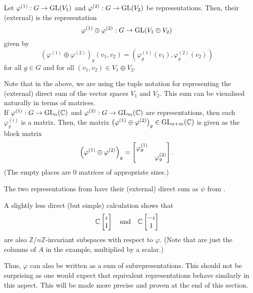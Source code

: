 \begin{defn}%
	Let $\varphi^{(1)}:G \to \operatorname{GL}(V_1)$ and $\varphi^{(2)}:G \to \operatorname{GL}(V_2)$ be representations. Then, their (external)  is the representation
	\begin{equation*} 
		\varphi^{(1)}\oplus\varphi^{(2)} : G \to \operatorname{GL}(V_1 \oplus V_2)
	\end{equation*}
	given by
	\begin{equation*} 
		\left(\varphi^{(1)}\oplus\varphi^{(2)}\right)_g(v_1, v_2) = \left(\varphi^{(1)}_g(v_1), \varphi^{(2)}_g(v_2)\right)
	\end{equation*}
	for all $g \in G$ and for all $(v_1, v_2) \in V_1 \oplus V_2.$
\end{defn}
Note that in the above, we are using the tuple notation for representing the (external) direct sum of the vector spaces $V_1$ and $V_2.$ This sum can be visualised naturally in terms of matrices.\\
If $\varphi^{(1)}:G\to \operatorname{GL}_n(\mathbb{C})$ and $\varphi^{(2)}:G \to \operatorname{GL}_m(\mathbb{C})$ are representations, then each $\varphi^{(i)}_g$ is a matrix. Then, the matrix $\left(\varphi^{(1)} \oplus \varphi^{(2)}\right)_g \in \operatorname{GL}_{n + m}(\mathbb{C})$ is given as the block matrix
\begin{equation*} 
	\left(\varphi^{(1)} \oplus \varphi^{(2)}\right)_g = \begin{bmatrix} \varphi_g^{(1)} &  \\  & \varphi_g^{(2)} \end{bmatrix}.
\end{equation*}
(The empty places are $0$ matrices of appropriate sizes.)

\begin{ex}
	The two representations from  have their (external) direct sum as $\psi$ from .

	A slightly less direct (but simple) calculation shows that 
	\begin{equation*} 
		\mathbb{C}\begin{bmatrix} \iota \\ 1 \end{bmatrix} \quad\text{and}\quad \mathbb{C}\begin{bmatrix} -\iota \\ 1 \end{bmatrix}
	\end{equation*}
	are also $\mathbb{Z}/n\mathbb{Z}$-invariant subspaces with respect to $\varphi.$ (Note that are just the columns of $A$ in the example, multiplied by a scalar.)

	Thus, $\varphi$ can also be written as a sum of subrepresentations. This should not be surprising as one would expect that equivalent representations behave similarly in this aspect. This will be made more precise and proven at the end of this section.
\end{ex}


